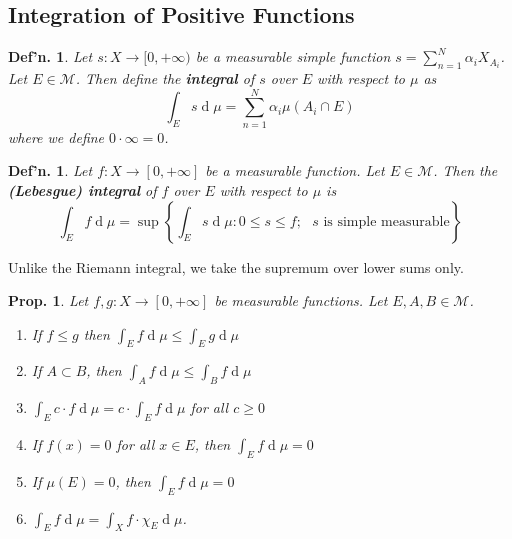 \documentclass[12pt, a4paper]{book}
\renewcommand{\d}[1]{\ensuremath{\operatorname{d}\!{#1}}} %
\newtheorem{definition}[theorem]{Def'n.}
\newtheorem{proposition}[theorem]{Prop.}
\theoremstyle{nonumberplain}
\begin{document}
\subsection{Integration of Positive Functions}
\begin{definition}
    Let $s:X\to[0,+\infty)$ be a measurable simple function $s=\sum\limits_{n=1}^N\alpha_i X_{A_i}$. %
    Let $E\in\mathcal{M}$.
    Then define the \textbf{integral} of $s$ over $E$ with respect to $\mu$ as
    \[\int_E s\d{\mu}=\sum\limits_{n=1}^N\alpha_i\mu(A_i\cap E)\]
    where we define $0\cdot\infty=0$.
\end{definition}
\begin{definition}
    Let $f:X\to[0,+\infty]$ be a measurable function.
    Let $E\in\mathcal{M}$.
    Then the \textbf{(Lebesgue) integral} of $f$ over $E$ with respect to $\mu$ is
    \[\int_E f\d{\mu}=\sup\left\{\int_E s\d{\mu}:0\leq s\leq f;\text{ $s$ is simple measurable}\right\}\]
\end{definition}
Unlike the Riemann integral, we take the supremum over lower sums only.
\begin{proposition}
    Let $f,g:X\to[0,+\infty]$ be measurable functions.
    Let $E,A,B\in\mathcal{M}$.
    \begin{enumerate}[nolistsep]
        \item If $f\leq g$ then $\int_E f\d{\mu}\leq\int_E g\d{\mu}$
        \item If $A\subset B$, then $\int_A f\d{\mu}\leq \int_B f\d{\mu}$
        \item $\int_E c\cdot f\d{\mu}=c\cdot\int_E f\d{\mu}$ for all $c\geq 0$
        \item If $f(x)=0$ for all $x\in E$, then $\int_E f\d{\mu}=0$
        \item If $\mu(E)=0$, then $\int_E f\d{\mu}=0$
        \item $\int_E f\d{\mu}=\int_X f\cdot \chi_E\d{\mu}$.
    \end{enumerate}
\end{proposition}
\end{document}
